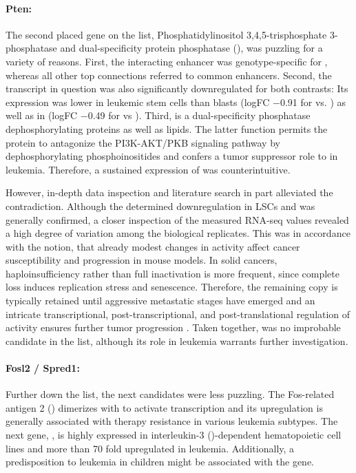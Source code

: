 \paragraph{Pten:} The second placed gene on the list, Phosphatidylinositol 3,4,5-trisphosphate 3-phos\-phatase and dual-specificity protein phosphatase (), was puzzling for a variety of reasons. First, the interacting enhancer was genotype-specific for \dnmtchip, whereas all other top connections referred to common enhancers. Second, the transcript in question was also significantly downregulated for both contrasts: Its expression was lower in leukemic stem cells than blasts (logFC \num{-0.91} for \kitlow vs. \kithi) as well as in \dnmtchip  (logFC \num{-0.49} for \dnmtwt vs \dnmtchipshort). Third,  is a dual-specificity phosphatase dephosphorylating proteins as well as lipids. The latter function permits the protein to antagonize the PI3K-AKT/PKB signaling pathway by dephosphorylating phosphoinositides\cite{Sun1999} and confers a tumor suppressor role to  in \mllafnine leukemia\cite{Hu2015,Sandhoefer2015}. Therefore, a sustained expression of  was counterintuitive. 

However, in-depth data inspection and literature search in part alleviated the contradiction. Although the determined downregulation in LSCs and \dnmtchip was generally confirmed, a closer inspection of the measured RNA-seq values revealed a high degree of variation among the biological replicates. This was in accordance with the notion, that already modest changes in  activity affect cancer susceptibility and progression in mouse models\cite{Alimonti2010}. In solid cancers, haploinsufficiency rather than full inactivation is more frequent\cite{Kwabi-Addo2001,Trotman2003}, since complete loss induces replication stress and senescence\cite{Parisotto2018}. Therefore, the remaining copy is typically retained until aggressive metastatic stages have emerged and an intricate transcriptional\cite{Thivierge2018}, post-transcriptional, and post-translational regulation of  activity ensures further tumor progression . Taken together,  was no improbable candidate in the list, although its role in \mllafnine leukemia warrants further investigation. 

\paragraph{Fosl2 / Spred1:} Further down the list, the next candidates were less puzzling. The Fos-related antigen 2 () dimerizes with  to activate  transcription and its upregulation is generally associated with therapy resistance in various leukemia subtypes\cite{Stam2010}. The next gene, , is highly expressed in interleukin-3 ()-dependent hematopoietic cell lines\cite{Nonami2004} and more than \num{70} fold upregulated in \mllaffour leukemia\cite{Marschalek2011}. Additionally, a predisposition to leukemia in children might be associated with the gene\cite{Pasmant2009,Batz2010}. 

